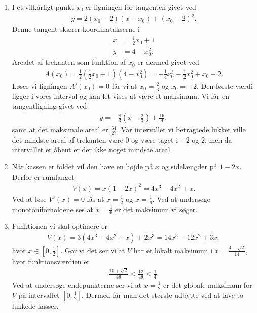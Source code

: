 \begin{enumerate}
	\item I et vilkårligt punkt $x_0$ er ligningen for tangenten givet ved 
	\begin{align*}
	y=2(x_0-2)(x-x_0)+(x_0-2)^2.
	\end{align*}
	Denne tangent skærer koordinatakserne i
	\begin{align*}
	x&=\frac{1}{2}x_0+1\\
	y&=4-x_0^2.
	\end{align*}
	Arealet af trekanten som funktion af $x_0$ er dermed givet ved
	\begin{align*}
	A(x_0)=\frac{1}{2}(\frac{1}{2}x_0+1)(4-x_0^2)=-\frac{1}{4}x_0^3-\frac{1}{2}x_0^2+x_0+2.
	\end{align*}
	Løser vi ligningen $A'(x_0)=0$ får vi at $x_0=\frac{2}{3}$ og $x_0=-2$. Den første værdi ligger i vores interval og kan let vises at være et maksimum. Vi får en tangentligning givet ved
	\begin{align*}
	y=-\frac{8}{3}(x-\frac{2}{3})+\frac{16}{9},
	\end{align*}
	samt at det maksimale areal er $\frac{64}{27}$. Var intervallet vi betragtede lukket ville det mindste areal af trekanten være $0$ og være taget i $-2$ og $2$, men da intervallet er åbent er der ikke noget mindste areal. 
	
	
	\item\label{it:opt1ans} Når kassen er foldet vil den have en højde på $x$ og sidelængder på $1-2x$. Derfor er rumfanget
	\begin{align*}
	V(x)=x(1-2x)^2=4x^3-4x^2+x.
	\end{align*}
	Ved at løse $V'(x)=0$ fås at $x=\frac{1}{2}$ og $x=\frac{1}{6}$. Ved at undersøge monotoniforholdene ses at $x=\frac{1}{6}$ er det maksimum vi søger.
	
	
	\item Funktionen vi skal optimere er
	\begin{align*}
	V(x)=3(4x^3-4x^2+x)+2x^3=14x^3-12x^2+3x,
	\end{align*}
	hvor $x\in [0,\frac{1}{2}]$. Gør vi det ser vi at $V$ har et lokalt maksimum i $x=\frac{4-\sqrt{2}}{14}$, hvor funktionsværdien er
	\begin{align*}
	\frac{10+\sqrt{2}}{49}<\frac{12}{49}<\frac{1}{4}.
	\end{align*}
	Ved at undersøge endepunkterne ser vi at $x=\frac{1}{2}$ er det globale maksimum for $V$ på intervallet $ [0,\frac{1}{2}] $. Dermed får man det største udbytte ved at lave to lukkede kasser.


\end{enumerate}
